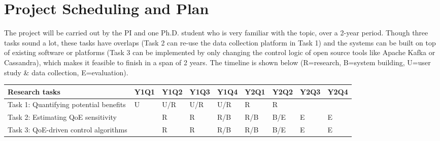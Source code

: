 \section{Project Scheduling and Plan}

The project will be carried out by the PI and one Ph.D. student who is very familiar with the topic, over a 2-year period.
Though three tasks sound a lot, these tasks have overlaps (\eg Task 2 can re-use the data collection platform in Task 1) and the systems can be built on top of existing software or platforms (\eg Task 3 can be implemented by only changing the control logic of open source tools like Apache Kafka or Cassandra), which makes it feasible to finish in a span of 2 years.
The timeline is shown below (R=research, B=system building, U=user study \& data collection, E=evaluation).
\begin{table}[h]
\footnotesize
\begin{tabular}{|l|l|l|l|l|l|l|l|l|}
\hline
Research tasks                           & Y1Q1 & Y1Q2 & Y1Q3 & Y1Q4 & Y2Q1 & Y2Q2 & Y2Q3 & Y2Q4 \\ \hline
Task 1: Quantifying potential benefits   & U    & U/R  & U/R  & U/R  &  R    &  R    &      &      \\ 
Task 2: Estimating QoE sensitivity &      & R    & R  & R/B  & R/B    & B/E    & E    & E    \\ 
Task 3: QoE-driven control algorithms    &    &   R    & R  & R/B  & R/B  & B/E  & E   &  E   \\ \hline
\end{tabular}
\end{table}




